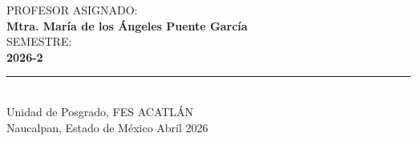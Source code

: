 \begin{titlepage}
{\normalsize PROFESOR ASIGNADO:}\\[0.2cm]
{\normalsize\textbf{Mtra. María de los Ángeles Puente García}}\\[0.6cm]

{\normalsize SEMESTRE:}\\[0.2cm]
{\normalsize\textbf{2026-2}}

\vfill

\noindent\rule{0.7\textwidth}{0.4pt}\\[0.3cm]
{\footnotesize Unidad de Posgrado, FES ACATLÁN}\\[0.1cm]
{\footnotesize Naucalpan, Estado de México \hfill Abril 2026}

\end{titlepage}
